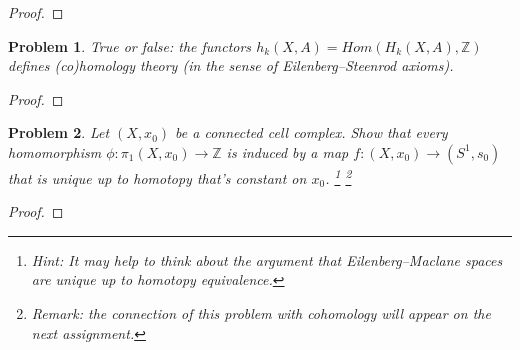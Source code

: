 \documentclass[11pt]{article}
\newtheorem{problem}{Problem}
\begin{document}
\begin{proof}

\end{proof}

\pagebreak 

\begin{problem}
True or false: the functors $h_k(X,A) = Hom(H_k(X,A), \mathbb Z)$ defines (co)homology theory (in the sense of Eilenberg--Steenrod axioms).
\end{problem}

\begin{proof}

\end{proof}

\pagebreak 

\begin{problem}
Let $(X,x_0)$ be a connected cell complex. Show that every homomorphism $\phi:\pi_1(X,x_0)\rightarrow\mathbb Z$ is induced by a map $f:(X, x_0)\rightarrow(S^1,s_0)$ that is unique up to homotopy that's constant on $x_0$. \footnote{Hint: It may help to think about the argument that Eilenberg--Maclane spaces are unique up to homotopy equivalence.} \footnote{Remark: the connection of this problem with cohomology will appear on the next assignment. } 
\end{problem}

\begin{proof}

\end{proof}
\end{document}
